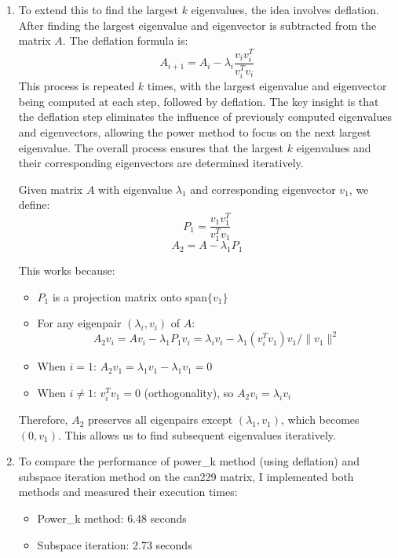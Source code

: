 \documentclass[11pt,a4paper, margin=1in]{article}
\begin{document}
\begin{enumerate}
    
    \item
    To extend this to find the largest \( k \) eigenvalues, the idea involves deflation. After finding the largest eigenvalue and eigenvector is subtracted from the matrix \( A \). The deflation formula is:
    \[
    A_{i+1} = A_i - \lambda_i \frac{v_i v^T_i}{v^T_i v_i}
    \]
    This process is repeated \( k \) times, with the largest eigenvalue and eigenvector being computed at each step, followed by deflation. The key insight is that the deflation step eliminates the influence of previously computed eigenvalues and eigenvectors, allowing the power method to focus on the next largest eigenvalue.
    The overall process ensures that the largest \( k \) eigenvalues and their corresponding eigenvectors are determined iteratively.

    Given matrix \( A \) with eigenvalue \( \lambda_1 \) and corresponding eigenvector \( v_1 \), we define:
    \[
    P_1 = \frac{v_1 v_1^T}{v_1^T v_1}
    \]
    \[
    A_2 = A - \lambda_1 P_1
    \]

    This works because:
    \begin{itemize}
        \item \( P_1 \) is a projection matrix onto span\(\{v_1\}\)
        \item For any eigenpair \((\lambda_i, v_i)\) of \(A\):
            \[ A_2v_i = Av_i - \lambda_1P_1v_i = \lambda_iv_i - \lambda_1(v_i^Tv_1)v_1/\|v_1\|^2 \]
        \item When \(i=1\): \(A_2v_1 = \lambda_1v_1 - \lambda_1v_1 = 0\)
        \item When \(i\neq1\): \(v_i^Tv_1 = 0\) (orthogonality), so \(A_2v_i = \lambda_iv_i\)
    \end{itemize}

    Therefore, \(A_2\) preserves all eigenpairs except \((\lambda_1, v_1)\), which becomes \((0, v_1)\). This allows us to find subsequent eigenvalues iteratively.

    \setcounter{enumi}{3}
    \item 
    To compare the performance of power\_k method (using deflation) and subspace iteration method on the can229 matrix, I implemented both methods and measured their execution times:
    
    \begin{itemize}
        \item Power\_k method: 6.48 seconds
        \item Subspace iteration: 2.73 seconds
    \end{itemize}
    

\end{enumerate}
\end{document}
